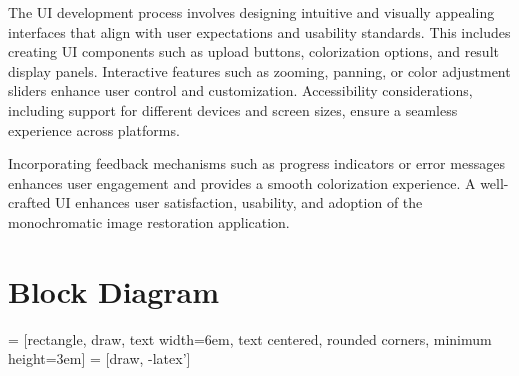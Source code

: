 The UI development process involves designing intuitive and visually appealing interfaces that align with user expectations and usability standards. This includes creating UI components such as upload buttons, colorization options, and result display panels. Interactive features such as zooming, panning, or color adjustment sliders enhance user control and customization. Accessibility considerations, including support for different devices and screen sizes, ensure a seamless experience across platforms.

Incorporating feedback mechanisms such as progress indicators or error messages enhances user engagement and provides a smooth colorization experience. A well-crafted UI enhances user satisfaction, usability, and adoption of the monochromatic image restoration application.
\clearpage
\section{Block Diagram}
 = [rectangle, draw, text width=6em, text centered, rounded corners, minimum height=3em]
 = [draw, -latex']

